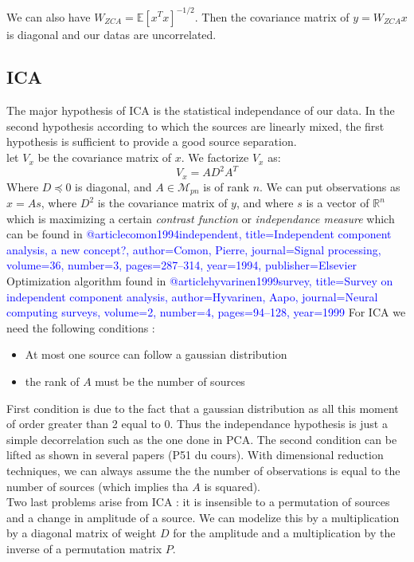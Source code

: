 \documentclass[a4paper,11pt,titlepage]{article}
\begin{document}
We can also have $W_{ZCA} = \mathds{E}[x^Tx]^{-1/2}$. Then the covariance matrix of $y = W_{ZCA}x$ is diagonal and our datas are uncorrelated. 
\subsection{ICA}
The major hypothesis of ICA is the statistical independance of our data. In the second hypothesis according to which the sources are linearly mixed, the first hypothesis is sufficient to provide a good source separation. \\
let $V_x$ be the covariance matrix of $x$. We factorize $V_x$ as:
\begin{equation*}
	V_x = AD^2A^T
\end{equation*}
Where $D \preccurlyeq 0$ is diagonal, and $A \in \mathcal{M}_{pn}$ is of rank $n$. We can put observations as $x = As$, where $D^2$ is the covariance matrix of $y$, and where $s$ is a vector of $\mathds{R}^n$ which is maximizing a certain \textit{contrast function} or \textit{independance measure} which can be found in \textcolor{blue}{@article{comon1994independent,
  title={Independent component analysis, a new concept?},
    author={Comon, Pierre},
  journal={Signal processing},
    volume={36},
  number={3},
    pages={287--314},
  year={1994},
    publisher={Elsevier}
}}
\\
Optimization algorithm found in \textcolor{blue}{@article{hyvarinen1999survey,
	  title={Survey on independent component analysis},
	    author={Hyvarinen, Aapo},
		  journal={Neural computing surveys},
		    volume={2},
			  number={4},
			    pages={94--128},
				  year={1999}
			  }}
For ICA we need the following conditions :
\begin{itemize}
	\item At most one source can follow a gaussian distribution
	\item the rank of $A$ must be the number of sources
\end{itemize}
First condition is due to the fact that a gaussian distribution as all this moment of order greater than 2 equal to 0. Thus the independance hypothesis is just a simple decorrelation such as the one done in PCA. The second condition can be lifted as shown in several papers (P51 du cours).
With dimensional reduction techniques, we can always assume the the number of observations is equal to the number of sources (which implies tha $A$ is squared). 
\\
Two last problems arise from ICA : it is insensible to a permutation of sources and a change in amplitude of a source. We can modelize this by a multiplication by a diagonal matrix of weight $D$ for the amplitude and a multiplication by the inverse of a permutation matrix $P$.
\end{document}
